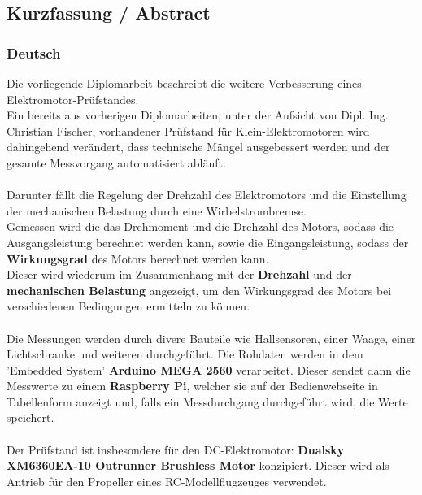 \documentclass[12pt,a4paper]{article}
\begin{document}
\subsection*{Kurzfassung / Abstract}
\subsubsection{Deutsch}
  Die vorliegende Diplomarbeit beschreibt die weitere Verbesserung eines Elektromotor-Prüfstandes. \\
  Ein bereits aus vorherigen Diplomarbeiten, unter der Aufsicht von Dipl. Ing. Christian Fischer,
  vorhandener Prüfstand für Klein-Elektromotoren wird dahingehend verändert, dass technische Mängel 
  ausgebessert werden und der gesamte Messvorgang automatisiert abläuft. \\\\
  Darunter fällt die Regelung der Drehzahl des Elektromotors und die Einstellung der mechanischen Belastung 
  durch eine Wirbelstrombremse. \\
%
  Gemessen wird die das Drehmoment und die Drehzahl des Motors, sodass die Ausgangsleistung berechnet werden kann, 
  sowie die Eingangsleistung, sodass der {\bf Wirkungsgrad} des Motors berechnet werden kann. \\
  Dieser wird wiederum im Zusammenhang mit der {\bf Drehzahl} und der {\bf mechanischen Belastung} angezeigt, um den 
  Wirkungsgrad des Motors bei verschiedenen Bedingungen ermitteln zu können. \\\\
%
  Die Messungen werden durch divere Bauteile wie Hallsensoren, einer Waage, einer Lichtschranke und weiteren durchgeführt. 
  Die Rohdaten werden in dem 'Embedded System' {\bf Arduino MEGA 2560} verarbeitet. 
  Dieser sendet dann die Messwerte zu einem {\bf Raspberry Pi}, welcher sie auf der Bedienwebseite 
  in Tabellenform anzeigt und, falls ein Messdurchgang durchgeführt wird, die Werte speichert. \\\\
%
  Der Prüfstand ist insbesondere für den DC-Elektromotor: {\bf Dualsky XM6360EA-10  Outrunner Brushless Motor} konzipiert. 
  Dieser wird als Antrieb für den Propeller eines RC-Modellflugzeuges verwendet. 
%
\newpage
\end{document}
